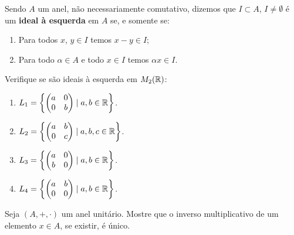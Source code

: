 \documentclass[12pt]{exam}
\begin{document}
    \vspace{.3cm}

    \questao{} Sendo $A$ um anel, não necessariamente comutativo, dizemos que $I \subset A$, $I \ne \emptyset$ é um \textbf{ideal à esquerda} em $A$ se, e somente se:
    \begin{enumerate}[label=({\roman*})]
        \item Para todos $x$, $y \in I$ temos $x - y \in I$;

        \item Para todo $\alpha \in A$ e todo $x \in I$ temos $\alpha x \in I$.
    \end{enumerate}

    Verifique se são ideais à esquerda em $M_2(\mathbb{R})$:
    \begin{enumerate}[label=({\alph*})]
        \item $L_1 = \left\{\begin{pmatrix}
            a & 0\\
            0 & b
        \end{pmatrix} \mid a, b \in \mathbb{R}\right\}$.

        \item $L_2 = \left\{\begin{pmatrix}
            a & b\\
            0 & c
        \end{pmatrix} \mid a, b, c \in \mathbb{R}\right\}$.

        \item $L_3 = \left\{\begin{pmatrix}
            a & 0\\
            b & 0
        \end{pmatrix} \mid a, b \in \mathbb{R}\right\}$.

        \item $L_4 = \left\{\begin{pmatrix}
            a & b\\
            0 & 0
        \end{pmatrix} \mid a, b \in \mathbb{R}\right\}$.
    \end{enumerate}

    \vspace{.3cm}

    \questao{}  Seja $(A, +, \cdot)$ um anel unitário. Mostre que o inverso multiplicativo de um elemento $x \in A$, se existir, é único.

    \vspace{.3cm}
\end{document}
